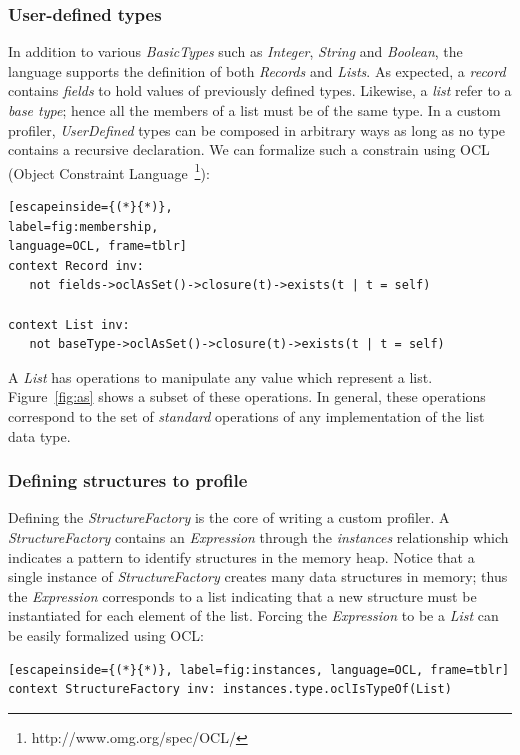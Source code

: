 \subsubsection{User-defined types}
In addition to various \textit{BasicTypes} such as \textit{Integer}, \textit{String} and \textit{Boolean}, the language supports the definition of both \textit{Records} and \textit{Lists}.
As expected, a \textit{record} contains \textit{fields} to hold values of previously defined types.
Likewise, a \textit{list} refer to a \textit{base type}; hence all the members of a list must be of the same type.
In a custom profiler, \textit{UserDefined} types can be composed in arbitrary ways as long as no type contains a recursive declaration.
We can formalize such a constrain using OCL (Object Constraint Language~\footnote{http://www.omg.org/spec/OCL/}):

\begin{lstlisting}[escapeinside={(*}{*)},
label=fig:membership,
language=OCL, frame=tblr]
context Record inv: 
   not fields->oclAsSet()->closure(t)->exists(t | t = self)

context List inv:
   not baseType->oclAsSet()->closure(t)->exists(t | t = self)
\end{lstlisting} 

A \textit{List} has operations to manipulate any value which represent a list.
Figure~\ref{fig:as} shows a subset of these operations.
In general, these operations correspond to the set of \textit{standard} operations of any implementation of the list data type.

\subsubsection{Defining structures to profile}
Defining the \textit{StructureFactory} is the core of writing a custom profiler.
A \textit{StructureFactory} contains an \textit{Expression} through the \textit{instances} relationship which indicates a pattern to identify structures in the memory heap.
Notice that a single instance of \textit{StructureFactory} creates many data structures in memory; thus the \textit{Expression} corresponds to a list indicating that a new structure must be instantiated for each element of the list.
Forcing the \textit{Expression} to be a \textit{List} can be easily formalized using OCL:

\begin{lstlisting}[escapeinside={(*}{*)}, label=fig:instances, language=OCL, frame=tblr]
context StructureFactory inv: instances.type.oclIsTypeOf(List)
\end{lstlisting}


